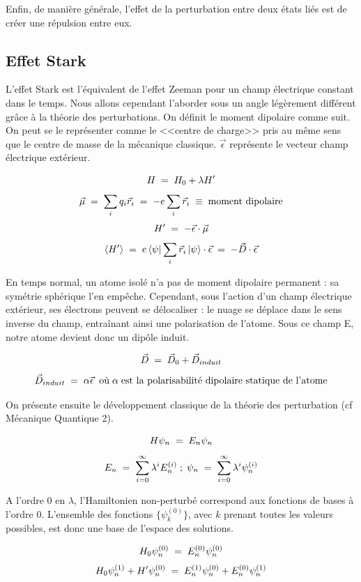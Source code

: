 Enfin, de manière générale, l'effet de la perturbation entre deux états liés est de créer une répulsion entre eux.




    \subsection{Effet Stark}




L'effet Stark est l'équivalent de l'effet Zeeman pour un champ électrique constant dans le temps. Nous allons cependant l'aborder sous un angle légèrement différent grâce à la théorie des perturbations. On définit le moment dipolaire comme suit. On peut se le représenter comme le <<centre de charge>> pris au même sens que le centre de masse de la mécanique classique. $\vec{\epsilon}$ représente le vecteur champ électrique extérieur.

\[
    H \; = \; H_0 + \lambda H'
\]
\[
    \vec{\mu} \; = \; \sum_i q_i \vec{r}_i \; = \; -e\sum_i \vec{r}_i\;\equiv\; \textrm{moment dipolaire}
\]
\[
    H' \; = \; -\vec{\epsilon}\cdot\vec{\mu}
\]
\[
    \expval{H'} \; = \; e\bra{\psi}\sum_i\vec{r}_i\ket{\psi}\cdot \vec{\epsilon} \; = \; -\vec{D}\cdot\vec{\epsilon}
\]

En temps normal, un atome isolé n'a pas de moment dipolaire permanent : sa symétrie sphérique l'en empêche. Cependant, sous l'action d'un champ électrique extérieur, ses électrons peuvent se délocaliser : le nuage se déplace dans le sens inverse du champ, entraînant ainsi une polarisation de l'atome. Sous ce champ E, notre atome devient donc un dipôle induit.

\[
    \vec{D} \; = \; \vec{D}_0 + \vec{D}_{induit}
\]
\[
    \vec{D}_{induit} \; = \; \alpha \vec{\epsilon} \;\; \text{où}\; \alpha \; \text{est la polarisabilité dipolaire statique de l'atome}
\]

On présente ensuite le développement classique de la théorie des perturbation (cf Mécanique Quantique 2).

\[
    H\psi_n \; = \; E_n \psi_n
\]
\[
    E_n \; = \; \sum_{i=0}^{\infty} \lambda^i E_n^{(i)}\; ; \; \psi_n \; = \; \sum_{i=0}^{\infty} \lambda^i \psi_n^{(i)}
\]

A l'ordre 0 en $\lambda$, l'Hamiltonien non-perturbé correspond aux fonctions de bases à l'ordre 0. L'ensemble des fonctions $\{\psi_k^{(0)}\}$, avec $k$ prenant toutes les valeurs possibles, est donc une base de l'espace des solutions.

\[
    H_0 \psi_n^{(0)} \; = \; E_n^{(0)} \psi_n^{(0)}
\]
\[
    H_0 \psi_n^{(1)} + H' \psi_n^{(0)} \; = \; E_n^{(1)} \psi_n^{(0)} + E_n^{(0)} \psi_n^{(1)}
\]

